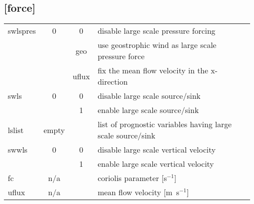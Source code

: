 \documentclass[a4paper,10pt]{extarticle}
\begin{document}
\subsection*{[force]}
\tablelasttail{\hline}
\begin{supertabular}{lccl}
swlspres      & 0     & 0     & disable large scale pressure forcing \\
              &       & geo   & use geostrophic wind as large scale pressure force \\
              &       & uflux & fix the mean flow velocity in the x-direction \\
swls          & 0     & 0     & disable large scale source/sink \\
              &       & 1     & enable large scale source/sink \\
lslist        & empty &       & list of prognostic variables having large scale source/sink \\
swwls         & 0     & 0     & disable large scale vertical velocity \\
              &       & 1     & enable large scale vertical velocity \\
fc            & n/a   &       & coriolis parameter [s$^{-1}$] \\
uflux         & n/a   &       & mean flow velocity [m~s$^{-1}$] \\
\end{supertabular}
\end{document}
